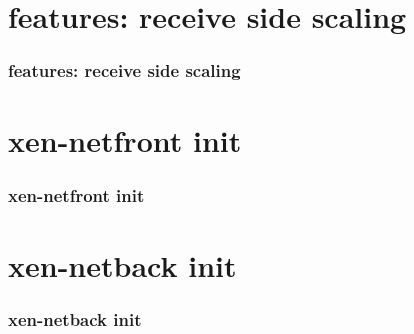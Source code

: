 \documentclass[aspectratio=169]{beamer}
\begin{document}

\section{features: receive side scaling}
\begin{frame}
\frametitle{features: receive side scaling}
\end{frame}


\section{xen-netfront init}
\begin{frame}
\frametitle{xen-netfront init}
\end{frame}


\section{xen-netback init}
\begin{frame}
\frametitle{xen-netback init}
\end{frame}


\end{document}
